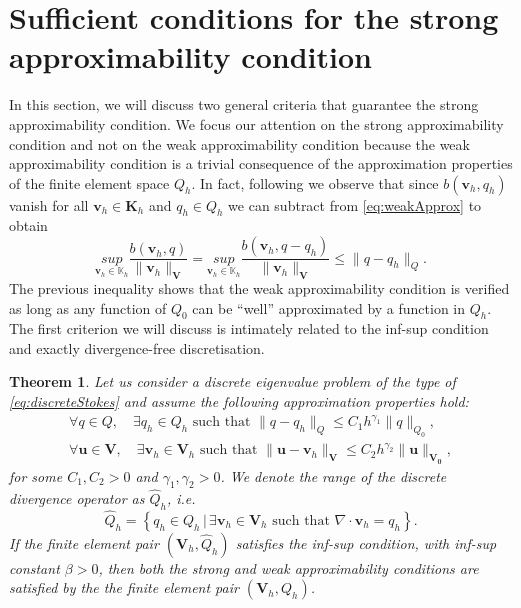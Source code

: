 \documentclass[USenglish]{article}
\theoremstyle{dgthm}
\newtheorem{theorem}{Theorem}
\theoremstyle{dgdef}
\let\vec\bm
\newcommand\norm[1]{\lVert#1\rVert}
\begin{document}
\section{Sufficient conditions for the strong approximability condition}
In this section, we will discuss two general criteria that guarantee the strong approximability condition.
We focus our attention on the strong approximability condition and not on the weak approximability condition because the weak approximability condition is a trivial consequence of the approximation properties of the finite element space $Q_h$.
In fact, following \cite{BBG} we observe that since $b(\vec{v}_h,q_h)$ vanish for all $\vec{v}_h\in \vec{K}_h$ and $q_h\in Q_h$ we can subtract from \eqref{eq:weakApprox} to obtain
\begin{equation}
  \underset{\vec{v}_h\in \mathbb{K}_h}{sup} \frac{b(\vec{v}_h, q)}{\norm{\vec{v}_h}_{\vec{V}}}= \underset{\vec{v}_h\in \mathbb{K}_h}{sup} \frac{b(\vec{v}_h, q-q_h)}{\norm{\vec{v}_h}_{\vec{V}}}\leq \norm{q-q_h}_{Q}.
\end{equation}
The previous inequality shows that the weak approximability condition is verified as long as any function of $Q_0$ can be ``well'' approximated by a function in $Q_h$.
The first criterion we will discuss is intimately related to the inf-sup condition and exactly divergence-free discretisation.
\begin{theorem}
  \label{thm:strongApproxInfSup}
  Let us consider a discrete eigenvalue problem of the type of \eqref{eq:discreteStokes} and assume the following approximation properties hold:
  \begin{align}
    \forall q\in Q, \quad \exists q_h\in Q_h \text{ such that } \norm{q-q_h}_{Q}\leq C_1 h^{\gamma_1}\norm{q}_{Q_0},\\
    \forall \vec{u}\in \vec{V}, \quad \exists \vec{v}_h\in \vec{V}_h \text{ such that } \norm{\vec{u}-\vec{v}_h}_{\vec{V}}\leq C_2 h^{\gamma_2}\norm{\vec{u}}_{\vec{V_0}},
  \end{align}
  for some $C_1,C_2>0$ and $\gamma_1,\gamma_2>0$.
  We denote the range of the discrete divergence operator as $\hat{Q}_h$, i.e.
  \begin{equation}
    \hat{Q}_h = \left\{q_h\in Q_h\,|\, \exists \vec{v}_h\in \vec{V}_h \text{ such that } \nabla\cdot \vec{v}_h=q_h\right\}.
  \end{equation}
  If the finite element pair $(\vec{V}_h,\hat{Q}_h)$ satisfies the inf-sup condition, with inf-sup constant $\beta>0$, then both the strong and weak approximability conditions are satisfied by the the finite element pair $(\vec{V}_h,Q_h)$.
\end{theorem}
\end{document}
